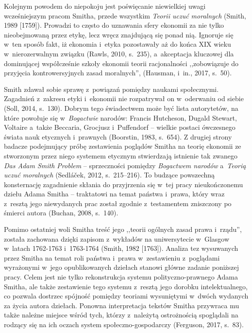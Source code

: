 Kolejnym powodem do niepokoju jest poświęcanie niewielkiej uwagi wcześniejszym pracom Smitha, przede wszystkim \textit{Teorii uczuć moralnych} \label{ref:RNDuvnqXhGdwl}(Smith, 1989 [1759]). Prowadzi to często do uznawania sfery ekonomii za nie tylko nieobejmowaną przez etykę, lecz wręcz znajdującą się ponad nią. Ignoruje się w~ten sposób fakt, iż ekonomia i~etyka pozostawały aż do końca XIX wieku w~nierozerwalnym związku \label{ref:RNDifRkgFWC39}(Rawls, 2010, s.~235), a~akceptacja kluczowej dla dominującej współcześnie szkoły ekonomii teorii racjonalności ,,zobowiązuje do przyjęcia kontrowersyjnych zasad moralnych'', \label{ref:RNDHRnH8e5vNp}(Hausman, i~in., 2017, s.~50).

Smith zdawał sobie sprawę z~powiązań pomiędzy naukami społecznymi. Zagadnień z~zakresu etyki i~ekonomii nie rozpatrywał on w~oderwaniu od siebie \label{ref:RNDc7lad85KL1}(Soll, 2014, s.~130). Dobrym tego świadectwem może być lista autorytetów, na które powołuje się w~\textit{Bogactwie} narodów: Francis Hutcheson, Dugald Stewart, Voltaire a~także Beccaria, Grocjusz i~Puffendorf -- wielkie postaci ówczesnego świata nauk etycznych i~prawnych \label{ref:RNDYwU1DwRdXl}(Boorstin, 1983, s.~654). Z drugiej strony badacze podejmujący próbę zestawienia poglądów Smitha na teorię ekonomii ze stworzonym przez niego systemem etycznym stwierdzają istnienie tak zwanego \textit{Das Adam Smith Problem} -- sprzeczności pomiędzy \textit{Bogactwem narodów} a~\textit{Teorią uczuć moralnych} \label{ref:RNDVh9gEUItJS}(Sedláček, 2012, s.~215–216). To budzące powszechną konsternację zagadnienie skłania do przyjrzenia się w~tej pracy nieukończonemu dziełu Adama Smitha -- traktatowi na temat państwa i~prawa, który wraz z~resztą jego niewydanych prac został zgodnie z~testamentem zniszczony po śmierci autora \label{ref:RNDsGGYAWrkxh}(Buchan, 2008, s.~140).

Pomimo ostatniej woli Smitha treść jego ,,teorii ogólnych zasad prawa i~rządu'', została zachowana dzięki zapisom z~wykładów na uniwersytecie w~Glasgow w~latach 1762-1763 i~1763-1764 \label{ref:RNDDaJwKBJe61}(Smith, 1982 [1763]). Analiza tez wysuwanych przez Smitha na temat roli państwa i~prawa w~zestawieniu z~poglądami wyrażonymi w~jego opublikowanych dziełach stanowi główne zadanie poniższej pracy. Celem jest nie tylko rekonstrukcja systemu polityczno-prawnego Adama Smitha, ale także zestawienie tego systemu z~resztą jego dorobku intelektualnego, co pozwala dostrzec spójność pomiędzy teoriami wysuniętymi w~dwóch wydanych za życia autora dziełach. Ponowna interpretacja tekstów Smitha przywraca mu także należne miejsce wśród tych, którzy z~należytą ostrożnością spoglądali na rodzący się na ich oczach system społeczno-gospodarczy \label{ref:RNDsLlADmbRUC}(Ferguson, 2017, s.~83).

